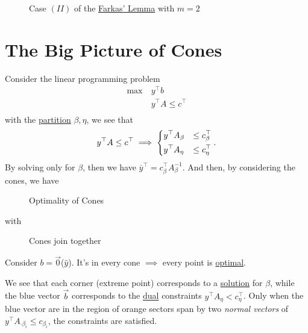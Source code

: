 \begin{figure}[H]
	\centering
	\caption{Case \((II)\) of the \hyperref[lma:Farkas-lemma]{Farkas' Lemma} with \(m = 2\)}
	\label{fig:Farkas-lemma-extended}
\end{figure}

\section{The Big Picture of Cones}
Consider the linear programming problem
\begin{align*}
	\max~ & y^{\top} b               \\
	      & y^{\top} A \leq c^{\top} \\
\end{align*}
with the \hyperref[def:partition]{partition} \(\beta, \eta\), we see that
\[
	y^{\top} A \leq c^{\top} \implies \begin{dcases}
		y^{\top} A_{\beta} & \leq c^{\top}_{\beta} \\
		y^{\top} A_{\eta}  & \leq c^{\top}_{\eta}
	\end{dcases}.
\]
By solving only for \(\beta\), then we have \(\overline{y}^{\top} = c_{\beta}^{\top} A^{-1}_{\beta}\). And then, by considering the cones, we have

\begin{figure}[H]
	\centering
	\caption[Caption for LOF]{Optimality of Cones\protect\footnotemark}
	\label{fig:opt-cones}
\end{figure}
with
\begin{figure}[H]
	\centering
	\caption{Cones join together}
	\label{fig:cones-join}
\end{figure}

\begin{note}
	Consider \(b = \vec{0}\)(\(\hat{y}\)). It's in every cone \(\implies\) every point is \hyperref[def:optimal-solution]{optimal}.
\end{note}

\begin{remark}
	We see that each corner (extreme point) corresponds to a \hyperref[def:solution-of-a-general-linear-programming-problem]{solution} for \(\beta\),
	while the blue vector \(\vec{b}\) corresponds to the \hyperref[def:dual]{dual} constraints \(y^{\top} A_{\eta}<c_{\eta}^{\top}\).
	Only when the blue vector are in the region of orange sectors span by two \emph{normal vectors} of \(y^{\top}A_{\cdot \beta_i}\leq c_{\beta_i}\),
	the constraints are satisfied.
\end{remark}

